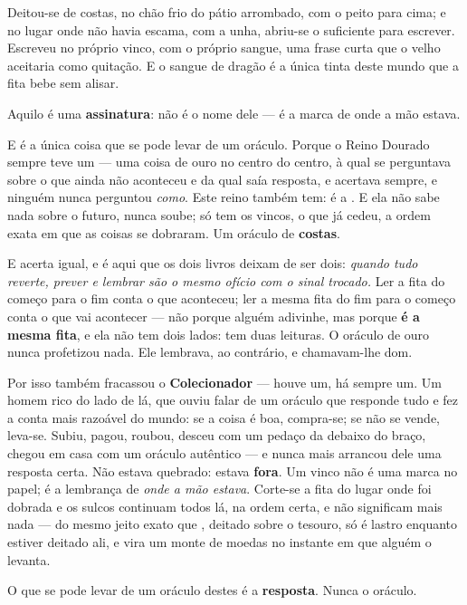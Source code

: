 \documentclass[livro.tex]{subfiles}
\begin{document}
Deitou-se de costas, no chão frio do pátio arrombado, com o peito para cima; e no lugar onde não
havia escama, com a unha, abriu-se o suficiente para escrever. Escreveu no próprio vinco, com o
próprio sangue, uma frase curta que o velho aceitaria como quitação. E o sangue de dragão é a
única tinta deste mundo que a fita bebe sem alisar.

Aquilo é uma \textbf{assinatura}: não é o nome dele --- é a marca de onde a mão estava.

E é a única coisa que se pode levar de um oráculo. Porque o Reino Dourado sempre teve um --- uma
coisa de ouro no centro do centro, à qual se perguntava sobre o que ainda não aconteceu e da qual
saía resposta, e acertava sempre, e ninguém nunca perguntou \emph{como}. Este reino também tem: é
a \Fit . E ela não sabe nada sobre o futuro, nunca soube; só tem os vincos, o que já cedeu, a
ordem exata em que as coisas se dobraram. Um oráculo de \textbf{costas}.

E acerta igual, e é aqui que os dois livros deixam de ser dois: \emph{quando tudo reverte, prever
e lembrar são o mesmo ofício com o sinal trocado.} Ler a fita do começo para o fim conta o que
aconteceu; ler a mesma fita do fim para o começo conta o que vai acontecer --- não porque alguém
adivinhe, mas porque \textbf{é a mesma fita}, e ela não tem dois lados: tem duas leituras. O
oráculo de ouro nunca profetizou nada. Ele lembrava, ao contrário, e chamavam-lhe dom.

Por isso também fracassou o \textbf{Colecionador} --- houve um, há sempre um. Um homem rico do
lado de lá, que ouviu falar de um oráculo que responde tudo e fez a conta mais razoável do mundo:
se a coisa é boa, compra-se; se não se vende, leva-se. Subiu, pagou, roubou, desceu com um pedaço
da \Fit debaixo do braço, chegou em casa com um oráculo autêntico --- e nunca mais arrancou dele
uma resposta certa. Não estava quebrado: estava \textbf{fora}. Um vinco não é uma marca no papel;
é a lembrança de \emph{onde a mão estava}. Corte-se a fita do lugar onde foi dobrada e os sulcos
continuam todos lá, na ordem certa, e não significam mais nada --- do mesmo jeito exato que \Odo ,
deitado sobre o tesouro, só é lastro enquanto estiver deitado ali, e vira um monte de moedas no
instante em que alguém o levanta.

O que se pode levar de um oráculo destes é a \textbf{resposta}. Nunca o oráculo.

\end{document}
